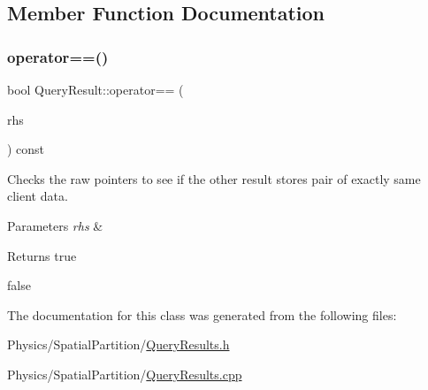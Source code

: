 \subsection{Member Function Documentation}
\mbox{\label{classQueryResult_ae0b1f5779416deb42a3e479e410813ea}} 
\subsubsection{\texorpdfstring{operator==()}{operator==()}}
{\footnotesize\ttfamily bool Query\+Result\+::operator== (\begin{DoxyParamCaption}\item[{const \hyperlink{classQueryResult}{Query\+Result} \&}]{rhs }\end{DoxyParamCaption}) const}



Checks the raw pointers to see if the other result stores pair of exactly same client data. 


\begin{DoxyParams}{Parameters}
{\em rhs} & \\
\hline
\end{DoxyParams}
\begin{DoxyReturn}{Returns}
true 

false 
\end{DoxyReturn}


The documentation for this class was generated from the following files\+:\begin{DoxyCompactItemize}
\item 
Physics/\+Spatial\+Partition/\hyperlink{QueryResults_8h}{Query\+Results.\+h}\item 
Physics/\+Spatial\+Partition/\hyperlink{QueryResults_8cpp}{Query\+Results.\+cpp}\end{DoxyCompactItemize}
